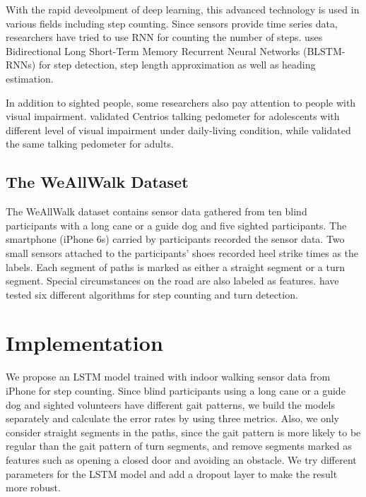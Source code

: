 \documentclass[11pt]{article}
\begin{document}
{With the rapid deveolpment of deep learning, this advanced technology is used in various fields including step counting. Since sensors provide time series data, researchers have tried to use RNN for counting the number of steps. \cite{edel2015advanced} uses Bidirectional Long Short-Term Memory Recurrent Neural Networks (BLSTM-RNNs) for step detection, step length approximation as well as heading estimation.

In addition to sighted people, some researchers also pay attention to people with visual impairment. \cite{haegele2015validation} validated Centrios talking pedometer for adolescents with different level of visual impairment under daily-living condition, while  \cite{holbrook2011validation} validated the same talking pedometer for adults.



\subsection{The WeAllWalk Dataset}

The WeAllWalk dataset \cite{flores2016weallwalk} contains sensor data gathered from ten blind participants with a long cane or a guide dog and five sighted participants. The smartphone (iPhone 6s) carried by participants recorded the sensor data. Two small sensors attached to the participants’ shoes recorded heel strike times as the labels. Each segment of paths is marked as either a straight segment or a turn segment. Special circumstances on the road are also labeled as features. \cite{flores2016weallwalk} have tested six different algorithms for step counting and turn detection. 


\section{Implementation}
We propose an LSTM model trained with indoor walking sensor data from iPhone for step counting. Since blind participants using a long cane or a guide dog and sighted volunteers have different gait patterns, we build the models separately and calculate the error rates by using three metrics. Also, we only consider straight segments in the paths, since the gait pattern is more likely to be regular than the gait pattern of turn segments, and remove segments marked as features such as opening a closed door and avoiding an obstacle. We try different parameters for the LSTM model and add a dropout layer to make the result more robust.

}
\end{document}
